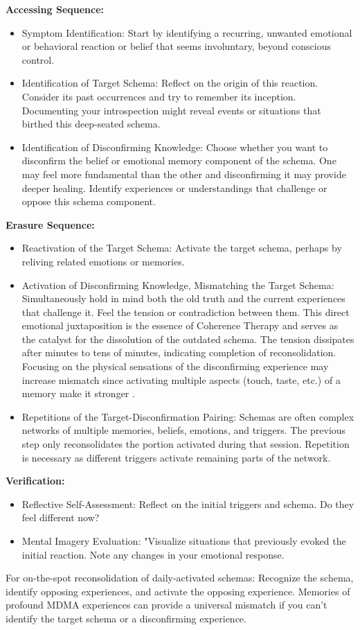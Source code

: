 \documentclass[12pt,letterpaper]{article}
\begin{document}
\noindent \textbf{Accessing Sequence:}
\begin{itemize}
    \item Symptom Identification: Start by identifying a recurring, unwanted emotional or behavioral reaction or belief that seems involuntary, beyond conscious control.
    \item Identification of Target Schema: Reflect on the origin of this reaction. Consider its past occurrences and try to remember its inception. Documenting your introspection might reveal events or situations that birthed this deep-seated schema.
    \item Identification of Disconfirming Knowledge: Choose whether you want to disconfirm the belief or emotional memory component of the schema. One may feel more fundamental than the other and disconfirming it may provide deeper healing. Identify experiences or understandings that challenge or oppose this schema component.
\end{itemize}
\noindent \textbf{Erasure Sequence:}
\begin{itemize}
    \item Reactivation of the Target Schema: Activate the target schema, perhaps by reliving related emotions or memories.
    \item Activation of Disconfirming Knowledge, Mismatching the Target Schema: Simultaneously hold in mind both the old truth and the current experiences that challenge it. Feel the tension or contradiction between them. This direct emotional juxtaposition is the essence of Coherence Therapy and serves as the catalyst for the dissolution of the outdated schema. The tension dissipates after minutes to tens of minutes, indicating completion of reconsolidation. Focusing on the physical sensations of the disconfirming experience may increase mismatch since activating multiple aspects (touch, taste, etc.) of a memory make it stronger \cite{brownAttachmentDisturbances,mayerMultimedia}.
    \item Repetitions of the Target-Disconfirmation Pairing: Schemas are often complex networks of multiple memories, beliefs, emotions, and triggers. The previous step only reconsolidates the portion activated during that session. Repetition is necessary as different triggers activate remaining parts of the network.
\end{itemize}
\noindent \textbf{Verification:}
\begin{itemize}
    \item Reflective Self-Assessment: Reflect on the initial triggers and schema. Do they feel different now?
    \item Mental Imagery Evaluation: "Visualize situations that previously evoked the initial reaction. Note any changes in your emotional response.
\end{itemize}
For on-the-spot reconsolidation of daily-activated schemas: Recognize the schema, identify opposing experiences, and activate the opposing experience. Memories of profound MDMA experiences can provide a universal mismatch if you can't identify the target schema or a disconfirming experience.
\end{document}
